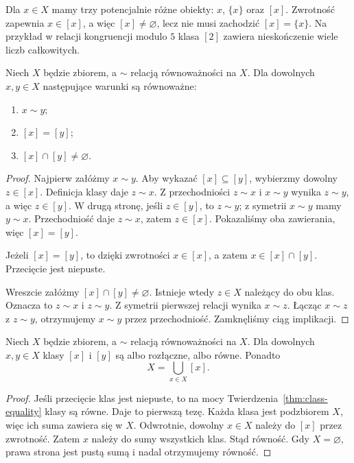 \begin{uwaga}
Dla $x\in X$ mamy trzy potencjalnie różne obiekty: $x$,
$\{x\}$ oraz $[x]$. Zwrotność zapewnia $x\in[x]$,
a więc $[x]\ne\varnothing$, lecz nie musi zachodzić
$[x]=\{x\}$. Na przykład w relacji kongruencji modulo $5$
klasa $[2]$ zawiera nieskończenie wiele liczb całkowitych.
\end{uwaga}

\begin{twierdzenie}\label{thm:class-equality}
Niech $X$ będzie zbiorem, a $\sim$ relacją równoważności na $X$.
Dla dowolnych $x,y\in X$ następujące warunki są równoważne:
\begin{enumerate}[label=(\roman*)]
\item $x\sim y$;
\item $[x]=[y]$;
\item $[x]\cap[y]\ne\varnothing$.
\end{enumerate}
\end{twierdzenie}
\begin{proof}
Najpierw załóżmy $x\sim y$. Aby wykazać $[x]\subseteq[y]$,
wybierzmy dowolny $z\in[x]$. Definicja klasy daje $z\sim x$.
Z przechodniości $z\sim x$ i $x\sim y$ wynika $z\sim y$,
a więc $z\in[y]$. W drugą stronę, jeśli $z\in[y]$, to
$z\sim y$; z symetrii $x\sim y$ mamy $y\sim x$.
Przechodniość daje $z\sim x$, zatem $z\in[x]$.
Pokazaliśmy oba zawierania, więc $[x]=[y]$.

Jeżeli $[x]=[y]$, to dzięki zwrotności $x\in[x]$,
a zatem $x\in[x]\cap[y]$. Przecięcie jest niepuste.

Wreszcie załóżmy $[x]\cap[y]\ne\varnothing$.
Istnieje wtedy $z\in X$ należący do obu klas.
Oznacza to $z\sim x$ i $z\sim y$.
Z symetrii pierwszej relacji wynika $x\sim z$.
Łącząc $x\sim z$ z $z\sim y$, otrzymujemy
$x\sim y$ przez przechodniość. Zamknęliśmy ciąg implikacji.
\end{proof}

\begin{wniosek}\label{cor:eq-disjoint}
Niech $X$ będzie zbiorem, a $\sim$ relacją równoważności na $X$.
Dla dowolnych $x,y\in X$ klasy $[x]$ i $[y]$
są albo rozłączne, albo równe. Ponadto
\[
 X=\bigcup_{x\in X}[x].
\]
\end{wniosek}
\begin{proof}
Jeśli przecięcie klas jest niepuste, to na mocy
Twierdzenia~\ref{thm:class-equality} klasy są równe.
Daje to pierwszą tezę. Każda klasa jest podzbiorem $X$,
więc ich suma zawiera się w $X$. Odwrotnie, dowolny
$x\in X$ należy do $[x]$ przez zwrotność. Zatem
$x$ należy do sumy wszystkich klas. Stąd równość.
Gdy $X=\varnothing$, prawa strona jest pustą sumą i nadal
otrzymujemy równość.
\end{proof}

